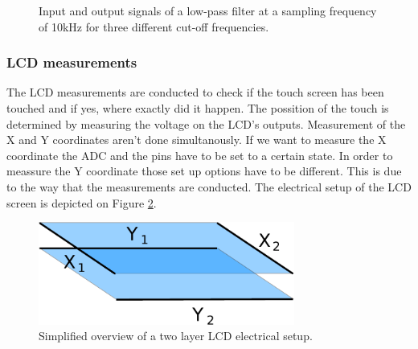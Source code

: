 \begin{figure}[!h]
  \centering
  \caption{Input and output signals of a low-pass filter at a sampling frequency of 10kHz for three different cut-off frequencies.}
  \label{fig:filter}
\end{figure}


\subsubsection{LCD measurements}
The LCD measurements are conducted to check if the touch screen has been touched and if yes, where exactly did it happen. The possition of the touch is determined by measuring the voltage on the LCD's outputs. Measurement of the X and Y coordinates aren't done simultanously. If we want to measure the X coordinate the ADC and the pins have to be set to a certain state. In order to meassure the Y coordinate those set up options have to be different. This is due to the way that the measurements are conducted. The electrical setup of the LCD screen is depicted on Figure \ref{fig:LCD_screen_measurement}.

\begin{figure}
  \centering
  \includegraphics[width=0.75\textwidth]{img/used/adc_layers.pdf}               
  \caption{Simplified overview of a two layer LCD electrical setup.}
  \label{fig:LCD_screen_measurement}
\end{figure}

